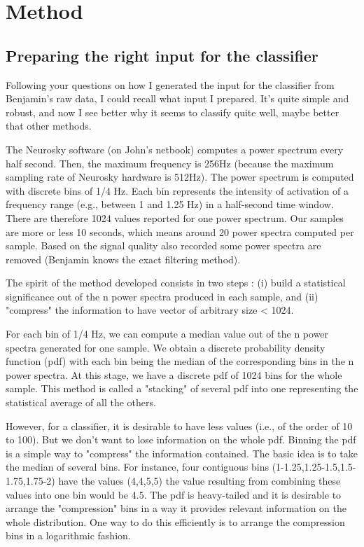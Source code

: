 \section{Method}


\subsection{Preparing the right input for the classifier}

Following your questions on how I generated the input for the classifier from Benjamin's raw data, I could recall what input I prepared. It's quite simple and robust, and now I see better why it seems to classify quite well, maybe better that other methods.

The Neurosky software (on John's netbook) computes a power spectrum every half second. Then, the maximum frequency is 256Hz (because the maximum sampling rate of Neurosky hardware is 512Hz). The power spectrum is computed with discrete bins of 1/4 Hz. Each bin represents the intensity of activation of a frequency range (e.g., between 1 and 1.25 Hz) in a half-second time window. There are therefore 1024 values reported for one power spectrum. Our samples are more or less 10 seconds, which means around 20 power spectra computed per sample. Based on the signal quality also recorded some power spectra are removed (Benjamin knows the exact filtering method).

The spirit of the method developed consists in two steps : (i) build a statistical significance out of the n power spectra produced in each sample, and (ii) "compress" the information to have vector of arbitrary size < 1024.

For each bin of 1/4 Hz, we can compute a median value out of the n power spectra generated for one sample.  We obtain a discrete probability density function (pdf) with each bin being the median of the corresponding bins in the n power spectra. At this stage, we have a discrete pdf of 1024 bins for the whole sample. This method is called a "stacking" of several pdf into one representing the statistical average of all the others.

However, for a classifier, it is desirable to have less values (i.e., of the order of 10 to 100). But we don't want to lose information on the whole pdf. Binning the pdf is a simple way to "compress" the information contained. The basic idea is to take the median of several bins. For instance, four contiguous bins (1-1.25,1.25-1.5,1.5-1.75,1.75-2) have the values (4,4,5,5) the value resulting from combining these values into one bin would be 4.5. The pdf is heavy-tailed and it is desirable to arrange the "compression" bins in a way it provides relevant information on the whole distribution. One way to do this efficiently is to arrange the compression bins in a logarithmic fashion.

